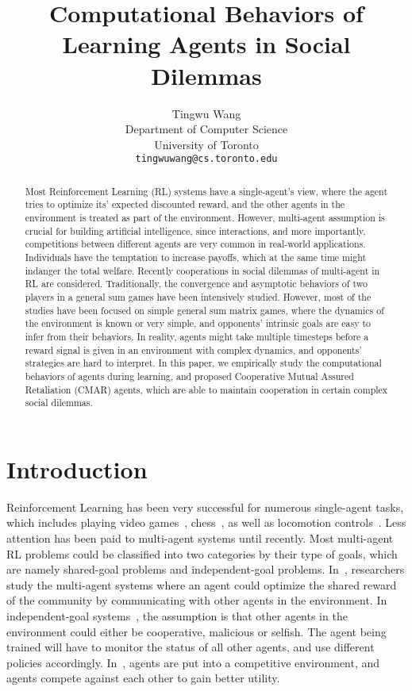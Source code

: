 \documentclass{article}
\title{Computational Behaviors of Learning Agents in Social Dilemmas}
\author{
  Tingwu Wang\\
  Department of Computer Science\\
  University of Toronto\\
  \texttt{tingwuwang@cs.toronto.edu} \\
}
\begin{document}
\maketitle
\begin{abstract}
Most Reinforcement Learning (RL) systems have a single-agent's view,
where the agent tries to optimize its' expected discounted reward,
    and the other agents in the environment is treated as part of the environment.
However, multi-agent assumption is crucial for building artificial intelligence,
since interactions, and more importantly,
competitions between different agents are very common in real-world applications.
Individuals have the temptation to increase payoffs, which at the same time
might indanger the total welfare. %
Recently cooperations in social dilemmas of multi-agent in RL are considered.
Traditionally, the convergence and asymptotic behaviors of two players
in a general sum games have been intensively studied.
However, most of the studies have been focused on simple general sum matrix games,
where the dynamics of the environment is known or very simple,
and opponents' intrinsic goals are easy to infer from their behaviors.
In reality, agents might take multiple timesteps before a reward signal is given
in an environment with complex dynamics,
and opponents' strategies are hard to interpret.
In this paper, we empirically study the computational behaviors of agents during learning,
and proposed Cooperative Mutual Assured Retaliation (CMAR) agents,
which are able to maintain cooperation in certain complex social dilemmas.
\end{abstract}

\section{Introduction}
Reinforcement Learning has been very successful for numerous single-agent tasks, which includes playing video games~\cite{mnih2015human},
chess~\cite{silver2016mastering,silver2017mastering},
as well as locomotion controls~\cite{gae,trpo,ppo}.
Less attention has been paid to multi-agent systems until recently.
Most multi-agent RL problems could be classified into two categories by their type of goals,
which are namely shared-goal problems and independent-goal problems.
In~\cite{tuyls2018symmetric,foerster2017learning,sukhbaatar2016learning},
researchers study the multi-agent systems where an agent could optimize the shared reward of the community by communicating with other agents in the environment.
In independent-goal systems~\cite{lerer2017maintaining,leibo2017multi},
the assumption is that other agents in the environment could either be cooperative,
malicious or selfish.
The agent being trained will have to monitor the status of all other agents,
and use different policies accordingly. 
In~\cite{al2017continuous}, agents are put into a competitive environment,
and agents compete against each other to gain better utility.
\end{document}
